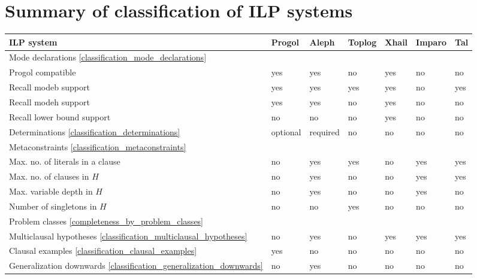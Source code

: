 \chapter{Summary of classification of ILP systems}\label{appendix_classification_summary}
\begin{center}
 \begin{tabular}{| l | l | l | l | l | l | l |}
    \hline
    ILP system & Progol & Aleph & Toplog & Xhail & Imparo & Tal \\ \hline
    \hline
    \multicolumn{7}{|l|}{Mode declarations \ref{classification_mode_declarations}} \\ \hline
    Progol compatible & yes & yes & no &  yes & no & no \\ \hline
    Recall modeb support & yes & yes & yes & yes & no & yes \\ \hline
    Recall modeh support & yes & yes & no & yes & no & no \\ \hline
    Recall lower bound support & no & no & no & yes & no & no \\ \hline
    \hline
    Determinations \ref{classification_determinations} & optional & required & no & no & no & no \\ \hline
    \hline
    \multicolumn{7}{|l|}{Metaconstraints \ref{classification_metaconstraints}} \\ \hline
    Max. no. of literals in a clause & no & yes & yes & no & yes & yes\\ \hline
    Max. no. of clauses in $H$ & no & yes & no & no & yes & yes\\ \hline
    Max. variable depth in $H$ & no & yes & no & no & yes & no\\ \hline
    Number of singletons in $H$ & no & no & yes & no & no & no\\ \hline    
    \hline
    
    \multicolumn{7}{|l|}{Problem classes \ref{completeness_by_problem_classes}} \\ \hline
    Multiclausal hypotheses \ref{classification_multiclausal_hypotheses}& no & yes & no & 
    yes & yes & yes \\ \hline
    
        \hline
    Clausal examples \ref{classification_clausal_examples}& yes & no & no & 
    no & no & no \\ \hline        
  	
  	Generalization downwards \ref{classification_generalization_downwards}
    & no & yes & no & no & no & no \\ \hline


\end{tabular}
\end{center}
